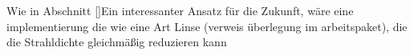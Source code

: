 Wie in Abschnitt \ref{}Ein interessanter Ansatz für die Zukunft, wäre eine implementierung die wie eine Art Linse (verweis überlegung im arbeitspaket), die die Strahldichte gleichmäßig reduzieren kann
